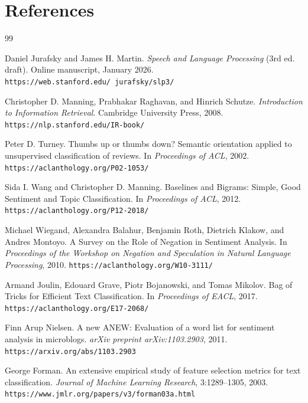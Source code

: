 \documentclass[12pt,a4paper]{article}
\begin{document}
\section*{References}
\begin{thebibliography}{99}

Daniel Jurafsky and James H. Martin.
\textit{Speech and Language Processing} (3rd ed. draft).
Online manuscript, January 2026.
\newline\texttt{https://web.stanford.edu/~jurafsky/slp3/}

Christopher D. Manning, Prabhakar Raghavan, and Hinrich Schutze.
\textit{Introduction to Information Retrieval}.
Cambridge University Press, 2008.
\newline\texttt{https://nlp.stanford.edu/IR-book/}

Peter D. Turney.
Thumbs up or thumbs down? Semantic orientation applied to unsupervised classification of reviews.
In \textit{Proceedings of ACL}, 2002.
\newline\texttt{https://aclanthology.org/P02-1053/}

Sida I. Wang and Christopher D. Manning.
Baselines and Bigrams: Simple, Good Sentiment and Topic Classification.
In \textit{Proceedings of ACL}, 2012.
\newline\texttt{https://aclanthology.org/P12-2018/}

Michael Wiegand, Alexandra Balahur, Benjamin Roth, Dietrich Klakow, and Andres Montoyo.
A Survey on the Role of Negation in Sentiment Analysis.
In \textit{Proceedings of the Workshop on Negation and Speculation in Natural Language Processing}, 2010.
\newline\texttt{https://aclanthology.org/W10-3111/}

Armand Joulin, Edouard Grave, Piotr Bojanowski, and Tomas Mikolov.
Bag of Tricks for Efficient Text Classification.
In \textit{Proceedings of EACL}, 2017.
\newline\texttt{https://aclanthology.org/E17-2068/}

Finn Arup Nielsen.
A new ANEW: Evaluation of a word list for sentiment analysis in microblogs.
\textit{arXiv preprint arXiv:1103.2903}, 2011.
\newline\texttt{https://arxiv.org/abs/1103.2903}

George Forman.
An extensive empirical study of feature selection metrics for text classification.
\textit{Journal of Machine Learning Research}, 3:1289--1305, 2003.
\newline\texttt{https://www.jmlr.org/papers/v3/forman03a.html}


\end{thebibliography}
\end{document}
